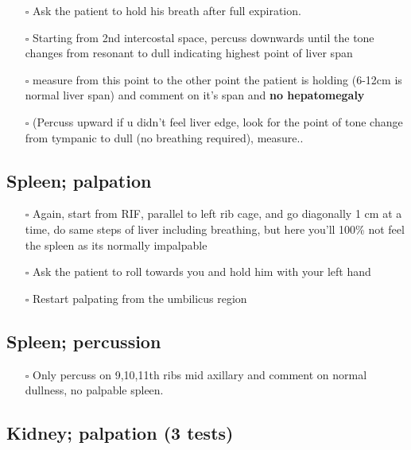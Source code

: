 \documentclass[
  13.5pt,
  a4paper,
  DIV=11,
  numbers=noendperiod]{scrreprt}
\providecommand{\tightlist}{%
  \setlength{\itemsep}{0pt}\setlength{\parskip}{0pt}}
\begin{document}
\begin{itemize}
\tightlist
\item[$\square$]
  Ask the patient to hold his breath after full expiration.
\item[$\square$]
  Starting from 2nd intercostal space, percuss downwards until the tone
  changes from resonant to dull indicating highest point of liver span
\item[$\square$]
  measure from this point to the other point the patient is holding
  (6-12cm is normal liver span) and comment on it's span and \textbf{no
  hepatomegaly}
\item[$\square$]
  (Percuss upward if u didn't feel liver edge, look for the point of
  tone change from tympanic to dull (no breathing required), measure..
\end{itemize}

\subsection{Spleen; palpation}\label{spleen-palpation}

\begin{itemize}
\tightlist
\item[$\square$]
  Again, start from RIF, parallel to left rib cage, and go diagonally 1
  cm at a time, do same steps of liver including breathing, but here
  you'll 100\% not feel the spleen as its normally impalpable
\item[$\square$]
  Ask the patient to roll towards you and hold him with your left hand
\item[$\square$]
  Restart palpating from the umbilicus region
\end{itemize}

\subsection{Spleen; percussion}\label{spleen-percussion}

\begin{itemize}
\tightlist
\item[$\square$]
  Only percuss on 9,10,11th ribs mid axillary and comment on normal
  dullness, no palpable spleen.
\end{itemize}

\subsection{Kidney; palpation (3 tests)}\label{kidney-palpation-3-tests}
\end{document}
